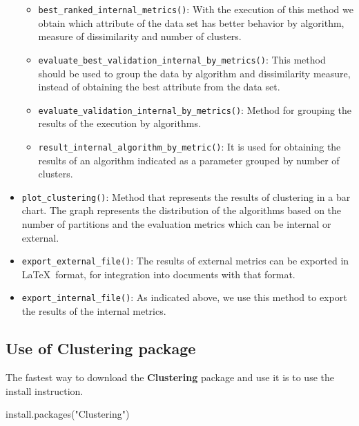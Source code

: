 \documentclass[
]{article}
\newenvironment{Shaded}{\begin{snugshade}}{\end{snugshade}}
\newcommand{\FunctionTok}[1]{\textcolor[rgb]{0.00,0.00,0.00}{#1}}
\newcommand{\NormalTok}[1]{#1}
\newcommand{\StringTok}[1]{\textcolor[rgb]{0.31,0.60,0.02}{#1}}
\providecommand{\tightlist}{%
  \setlength{\itemsep}{0pt}\setlength{\parskip}{0pt}}
\begin{document}
\begin{itemize}
  \begin{itemize}
  \tightlist
  \item
    \texttt{best\_ranked\_internal\_metrics()}: With the execution of
    this method we obtain which attribute of the data set has better
    behavior by algorithm, measure of dissimilarity and number of
    clusters.
  \item
    \texttt{evaluate\_best\_validation\_internal\_by\_metrics()}: This
    method should be used to group the data by algorithm and
    dissimilarity measure, instead of obtaining the best attribute from
    the data set.
  \item
    \texttt{evaluate\_validation\_internal\_by\_metrics()}: Method for
    grouping the results of the execution by algorithms.
  \item
    \texttt{result\_internal\_algorithm\_by\_metric()}: It is used for
    obtaining the results of an algorithm indicated as a parameter
    grouped by number of clusters.
  \end{itemize}
\item
  \texttt{plot\_clustering()}: Method that represents the results of
  clustering in a bar chart. The graph represents the distribution of
  the algorithms based on the number of partitions and the evaluation
  metrics which can be internal or external.
\item
  \texttt{export\_external\_file()}: The results of external metrics can
  be exported in \LaTeX~format, for integration into documents with that
  format.
\item
  \texttt{export\_internal\_file()}: As indicated above, we use this
  method to export the results of the internal metrics.
\end{itemize}

\hypertarget{use-of-clustering-package}{%
\subsection{\texorpdfstring{Use of \textbf{Clustering}
package}{Use of Clustering package}}\label{use-of-clustering-package}}

The fastest way to download the \textbf{Clustering} package and use it
is to use the install instruction.

\begin{Shaded}
\begin{Highlighting}[]
\FunctionTok{install.packages}\NormalTok{(}\StringTok{"Clustering"}\NormalTok{)}
\end{Highlighting}
\end{Shaded}
\end{document}

